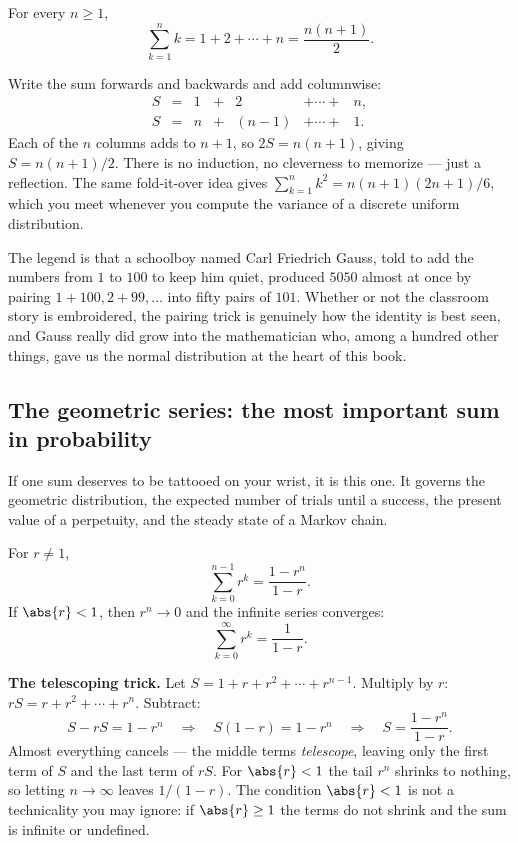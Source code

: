 \begin{proposition}
\label{ch39:gauss}
For every $n \ge 1$,
\[
  \sum_{k=1}^{n} k = 1 + 2 + \cdots + n = \frac{n(n+1)}{2}.
\]
\end{proposition}

\begin{whybox}
Write the sum forwards and backwards and add columnwise:
\[
\begin{array}{ccccccc}
S &=& 1 &+& 2 &+ \cdots +& n,\\
S &=& n &+& (n-1) &+ \cdots +& 1.
\end{array}
\]
Each of the $n$ columns adds to $n+1$, so $2S = n(n+1)$, giving $S =
n(n+1)/2$. There is no induction, no cleverness to memorize --- just a
reflection. The same fold-it-over idea gives $\sum_{k=1}^n k^2 =
n(n+1)(2n+1)/6$, which you meet whenever you compute the variance of a
discrete uniform distribution.
\end{whybox}

\begin{historybox}
The legend is that a schoolboy named Carl Friedrich Gauss, told to add the
numbers from $1$ to $100$ to keep him quiet, produced $5050$ almost at once by
pairing $1{+}100, 2{+}99, \dots$ into fifty pairs of $101$. Whether or not the
classroom story is embroidered, the pairing trick is genuinely how the
identity is best seen, and Gauss really did grow into the mathematician who,
among a hundred other things, gave us the normal distribution at the heart of
this book.
\end{historybox}

\subsection{The geometric series: the most important sum in probability}

If one sum deserves to be tattooed on your wrist, it is this one. It governs
the geometric distribution, the expected number of trials until a success, the
present value of a perpetuity, and the steady state of a Markov chain.

\begin{proposition}
\label{ch39:geom}
For $r \neq 1$,
\[
  \sum_{k=0}^{n-1} r^k = \frac{1 - r^n}{1 - r}.
\]
If $\abs{r} < 1$, then $r^n \to 0$ and the infinite series converges:
\[
  \sum_{k=0}^{\infty} r^k = \frac{1}{1 - r}.
\]
\end{proposition}

\begin{whybox}
\textbf{The telescoping trick.} Let $S = 1 + r + r^2 + \cdots + r^{n-1}$.
Multiply by $r$: $rS = r + r^2 + \cdots + r^n$. Subtract:
\[
  S - rS = 1 - r^n \quad\Longrightarrow\quad S(1-r) = 1 - r^n
  \quad\Longrightarrow\quad S = \frac{1-r^n}{1-r}.
\]
Almost everything cancels --- the middle terms \emph{telescope}, leaving only
the first term of $S$ and the last term of $rS$. For $\abs{r}<1$ the tail
$r^n$ shrinks to nothing, so letting $n \to \infty$ leaves $1/(1-r)$. The
condition $\abs{r}<1$ is not a technicality you may ignore: if $\abs{r}\ge 1$
the terms do not shrink and the sum is infinite or undefined.
\end{whybox}

